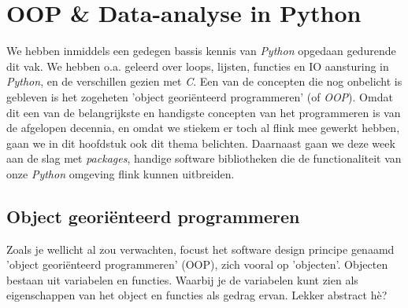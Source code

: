 \chapter{OOP \& Data-analyse in Python}

We hebben inmiddels een gedegen bassis kennis van \textit{Python} opgedaan gedurende dit vak. We hebben o.a. geleerd over loops, lijsten, functies en IO aansturing in \textit{Python}, en de verschillen gezien met \textit{C}. Een van de concepten die nog onbelicht is gebleven is het zogeheten 'object georiënteerd programmeren' (of \textit{OOP}).
Omdat dit een van de belangrijkste en handigste concepten van het programmeren is van de afgelopen decennia, en omdat we stiekem er toch al flink mee gewerkt hebben, gaan we in dit hoofdstuk ook dit thema belichten. Daarnaast gaan we deze week aan de slag met \textit{packages}, handige software bibliotheken die de functionaliteit van onze \textit{Python} omgeving flink kunnen uitbreiden. 

\section{Object georiënteerd programmeren}
Zoals je wellicht al zou verwachten, focust het software design principe genaamd 'object georiënteerd programmeren' (OOP), zich vooral op 'objecten'. Objecten bestaan uit variabelen en functies. Waarbij je de variabelen kunt zien als eigenschappen van het object en functies als gedrag ervan. Lekker abstract hè? 

